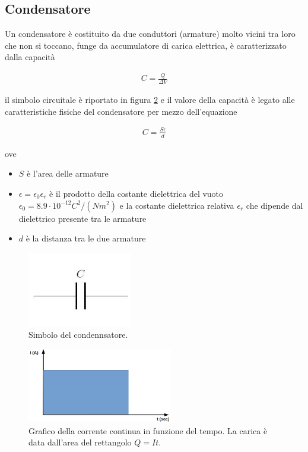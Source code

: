 \documentclass[17pt]{extarticle}
\begin{document}
\begin{enumerate}
\subsection{Condensatore}
Un condensatore è costituito da due conduttori (armature) molto vicini tra loro che non si toccano, funge da accumulatore di carica elettrica, è caratterizzato dalla capacità

\begin{eqnarray}
	C = \frac{Q}{\Delta V} %
\end{eqnarray}


il simbolo circuitale è riportato in figura \ref{fig:condensatoreSimbolo} e il valore della capacità è legato alle caratteristiche fisiche del condensatore per mezzo dell'equazione  

\begin{eqnarray}
	C = \frac{S\epsilon}{d}
\end{eqnarray}

ove
\begin{itemize}
	\item $S$ è l'area delle armature
	\item $\epsilon = \epsilon_0 \epsilon_r$ è il prodotto della costante dielettrica del vuoto $\epsilon_0 = 8.9\cdot 10^{-12}C^2/(Nm^2)$ e la costante dielettrica relativa $\epsilon_r$ che dipende dal dielettrico presente tra le armature
	\item $d$ è la distanza tra le due armature 
\end{itemize}






\begin{figure}[b!]		
	\centering
   	\includegraphics[width=1.8in]{condensatoreSimbolo.png}
  	\caption{Simbolo del condennsatore.}
   	\label{fig:condensatoreSimbolo}
\end{figure}


\begin{figure}[t]		
	\centering
   	\includegraphics[width=2.5in]{correnteContinua_tempo_grafico.jpg}
  	\caption{Grafico della corrente continua in funzione del tempo. La carica è data dall'area del rettangolo $Q =It$.}
   	\label{fig:condensatoreSimbolo}
\end{figure}



\end{enumerate}
\end{document}
